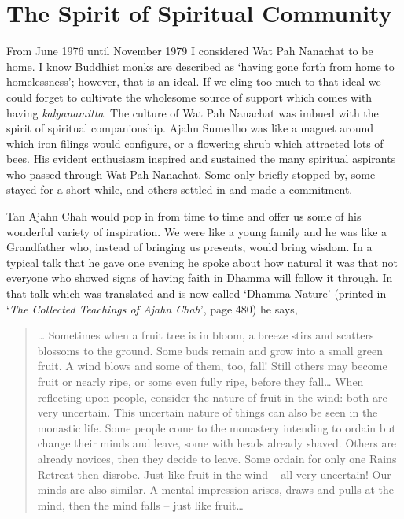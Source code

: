 \chapter{The Spirit of Spiritual Community}

From June 1976 until November 1979 I considered Wat Pah Nanachat to be
home. I know Buddhist monks are described as `having gone forth from
home to homelessness'; however, that is an ideal. If we cling too much
to that ideal we could forget to cultivate the wholesome source of
support which comes with having \emph{kalyanamitta}. The culture of Wat
Pah Nanachat was imbued with the spirit of spiritual companionship.
Ajahn Sumedho was like a magnet around which iron filings would
configure, or a flowering shrub which attracted lots of bees. His
evident enthusiasm inspired and sustained the many spiritual aspirants
who passed through Wat Pah Nanachat. Some only briefly stopped by, some
stayed for a short while, and others settled in and made a commitment.

Tan Ajahn Chah would pop in from time to time and offer us some of his
wonderful variety of inspiration. We were like a young family and he was
like a Grandfather who, instead of bringing us presents, would bring
wisdom. In a typical talk that he gave one evening he spoke about how
natural it was that not everyone who showed signs of having faith in
Dhamma will follow it through. In that talk which was translated and is
now called `Dhamma Nature' (printed in
`\emph{The Collected Teachings of Ajahn Chah}\cite{collected}', page 480)
he says,

\begin{quotation}
\ldots{} Sometimes when a fruit tree is in bloom, a breeze stirs and
scatters blossoms to the ground. Some buds remain and grow into a small
green fruit. A wind blows and some of them, too, fall! Still others may
become fruit or nearly ripe, or some even fully ripe, before they
fall\ldots{} When reflecting upon people, consider the nature of fruit in
the wind: both are very uncertain. This uncertain nature of things can
also be seen in the monastic life. Some people come to the monastery
intending to ordain but change their minds and leave, some with heads
already shaved. Others are already novices, then they decide to leave.
Some ordain for only one Rains Retreat then disrobe. Just like fruit in
the wind -- all very uncertain! Our minds are also similar. A mental
impression arises, draws and pulls at the mind, then the mind falls --
just like fruit\ldots{}
\end{quotation}

